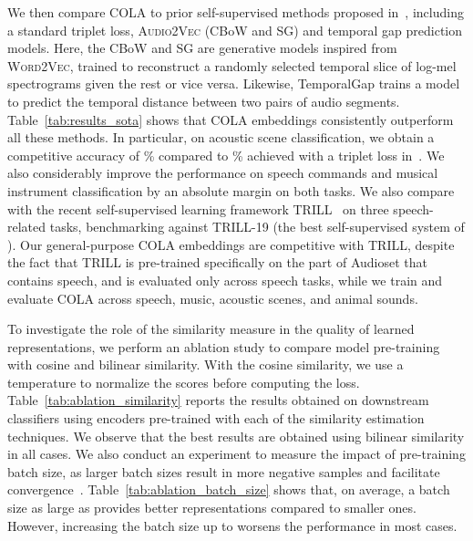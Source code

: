 \documentclass{article}
\newcommand{\ours}{COLA }
\begin{document}
We then compare \ours to prior self-supervised methods proposed in~\cite{tagliasacchi2019self, tagliasacchi2020pre}, including a standard triplet loss, \textsc{Audio2Vec} (CBoW and SG) and temporal gap prediction models. Here, the CBoW and SG are generative models inspired from \textsc{Word2Vec}, trained to reconstruct a randomly selected temporal slice of log-mel spectrograms given the rest or vice versa. Likewise, TemporalGap trains a model to predict the temporal distance between two pairs of audio segments. Table~\ref{tab:results_sota} shows that \ours embeddings consistently outperform all these methods. In particular, on acoustic scene classification, we obtain a competitive accuracy of \% compared to \% achieved with a triplet loss in~\cite{tagliasacchi2019self}. We also considerably improve the performance on speech commands and musical instrument classification by an absolute  margin on both tasks. We also compare with the recent self-supervised learning framework TRILL~\cite{shor2020towards} on three speech-related tasks, benchmarking against TRILL-19 (the best self-supervised system of \cite{shor2020towards}). Our general-purpose \ours embeddings are competitive with TRILL, despite the fact that TRILL is pre-trained specifically on the part of Audioset that contains speech, and is evaluated only across speech tasks, while we train and evaluate \ours across speech, music, acoustic scenes, and animal sounds.

To investigate the role of the similarity measure in the quality of learned representations, we perform an ablation study to compare model pre-training with cosine and bilinear similarity. With the cosine similarity, we use a temperature  to normalize the scores before computing the loss. Table~\ref{tab:ablation_similarity} reports the results obtained on downstream classifiers using encoders pre-trained with each of the similarity estimation techniques. We observe that the best results are obtained using bilinear similarity in all cases. We also conduct an experiment to measure the impact of pre-training batch size, as larger batch sizes result in more negative samples and facilitate convergence~\cite{chen2020simple}. Table~\ref{tab:ablation_batch_size} shows that, on average, a batch size as large as  provides better representations compared to smaller ones. However, increasing the batch size up to  worsens the performance in most cases. 
\end{document}
